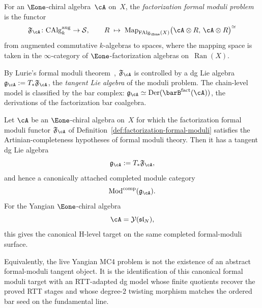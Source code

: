 \begin{definition}
\label{def:factorization-formal-moduli}
For an $\Eone$-chiral algebra~$\cA$ on~$X$, the
\emph{factorization formal moduli problem} is the functor
\[
\mathfrak{F}_{\cA}\colon
\mathrm{CAlg}^{\mathrm{aug}}_{k}
\to \mathcal{S},
\qquad
R \;\mapsto\;
\operatorname{Map}_{\mathrm{FAlg}_{\Eone}(X)}
 \bigl(\cA \otimes R,\, \cA \otimes R\bigr)^{\simeq}
\]
from augmented commutative $k$-algebras to spaces, where the mapping
space is taken in the $\infty$-category of
$\Eone$-factorization algebras on~$\operatorname{Ran}(X)$.

By Lurie's formal moduli theorem~\cite{LurieDAGX},
$\mathfrak{F}_{\cA}$ is controlled by a dg Lie algebra
$\mathfrak{g}_{\cA} := T_{*}\mathfrak{F}_{\cA}$,
the \emph{tangent Lie algebra} of the moduli problem.
The chain-level model is classified by the bar complex:
$\mathfrak{g}_{\cA} \simeq
\operatorname{Der}(\barB^{\mathrm{fact}}(\cA))$,
the derivations of the factorization bar coalgebra.
\end{definition}

\begin{proposition}
\label{prop:yangian-canonical-hlevel-target}
Let $\cA$ be an $\Eone$-chiral algebra on~$X$ for which the
factorization formal moduli functor
$\mathfrak{F}_{\cA}$ of
Definition~\ref{def:factorization-formal-moduli} satisfies the
Artinian-completeness hypotheses of formal moduli theory. Then it has
a tangent dg Lie algebra
\[
\mathfrak{g}_{\cA}:=T_*\mathfrak{F}_{\cA},
\]
and hence a canonically attached completed module category
\[
\operatorname{Mod}^{\mathrm{comp}}(\mathfrak{g}_{\cA}).
\]
For the Yangian $\Eone$-chiral algebra
\[
\cA=\mathcal{Y}(\mathfrak{sl}_N),
\]
this gives the canonical H-level target on the same completed
formal-moduli surface.

Equivalently, the live Yangian MC4 problem is not the existence of an
abstract formal-moduli tangent object. It is the identification of this
canonical formal
moduli target with an RTT-adapted dg model whose finite quotients
recover the proved RTT stages and whose degree-$2$ twisting
morphism matches the ordered bar seed on the fundamental line.
\end{proposition}

